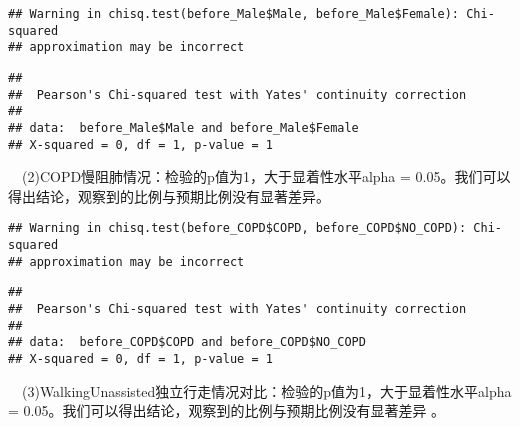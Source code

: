 \documentclass[
]{article}
\newenvironment{Shaded}{\begin{snugshade}}{\end{snugshade}}
\newcommand{\AttributeTok}[1]{\textcolor[rgb]{0.77,0.63,0.00}{#1}}
\newcommand{\FunctionTok}[1]{\textcolor[rgb]{0.00,0.00,0.00}{#1}}
\newcommand{\NormalTok}[1]{#1}
\newcommand{\OtherTok}[1]{\textcolor[rgb]{0.56,0.35,0.01}{#1}}
\newcommand{\SpecialCharTok}[1]{\textcolor[rgb]{0.00,0.00,0.00}{#1}}
\newcommand{\StringTok}[1]{\textcolor[rgb]{0.31,0.60,0.02}{#1}}
\begin{document}
\begin{verbatim}
## Warning in chisq.test(before_Male$Male, before_Male$Female): Chi-squared
## approximation may be incorrect
\end{verbatim}

\begin{verbatim}
## 
##  Pearson's Chi-squared test with Yates' continuity correction
## 
## data:  before_Male$Male and before_Male$Female
## X-squared = 0, df = 1, p-value = 1
\end{verbatim}

 (2)COPD慢阻肺情况：检验的p值为1，大于显着性水平alpha =
0.05。我们可以得出结论，观察到的比例与预期比例没有显著差异。

\begin{Shaded}
\end{Shaded}

\begin{verbatim}
## Warning in chisq.test(before_COPD$COPD, before_COPD$NO_COPD): Chi-squared
## approximation may be incorrect
\end{verbatim}

\begin{verbatim}
## 
##  Pearson's Chi-squared test with Yates' continuity correction
## 
## data:  before_COPD$COPD and before_COPD$NO_COPD
## X-squared = 0, df = 1, p-value = 1
\end{verbatim}

 (3)WalkingUnassisted独立行走情况对比：检验的p值为1，大于显着性水平alpha
= 0.05。我们可以得出结论，观察到的比例与预期比例没有显著差异 。
\end{document}
